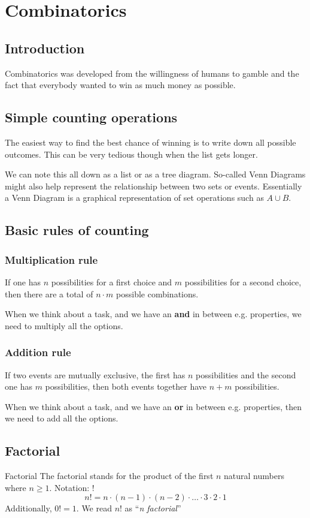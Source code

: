 \newsection
\section{Combinatorics}
\label{sec:combinatorics}
\subsection{Introduction}
Combinatorics was developed from the willingness of humans to gamble and the fact that everybody wanted to win as much money as possible.

\subsection{Simple counting operations}
The easiest way to find the best chance of winning is to write down all possible outcomes. This can be very tedious though when the list gets longer.

We can note this all down as a list or as a tree diagram. So-called Venn Diagrams might also help represent the relationship between two sets or events. Essentially a Venn Diagram is a graphical representation of set operations such as $A \cup B$.


\subsection{Basic rules of counting}
\subsubsection{Multiplication rule}
If one has $n$ possibilities for a first choice and $m$ possibilities for a second choice, then there are a total of $n \cdot m$ possible combinations.

When we think about a task, and we have an \textbf{and} in between e.g. properties, we need to multiply all the options.

\subsubsection{Addition rule}
If two events are mutually exclusive, the first has $n$ possibilities and the second one has $m$ possibilities, then both events together have $n+m$ possibilities.

When we think about a task, and we have an \textbf{or} in between e.g. properties, then we need to add all the options.


\newpage
\subsection{Factorial}
\begin{definition}[]{Factorial}
    The factorial stands for the product of the first $n$ natural numbers where $n \ge 1$. Notation: $!$
    \[
        n! = n \cdot (n - 1) \cdot (n - 2) \cdot \ldots \cdot 3 \cdot 2 \cdot 1
    \]
    Additionally, $0! = 1$. We read $n!$ as ``\textit{n factorial}''
\end{definition}

